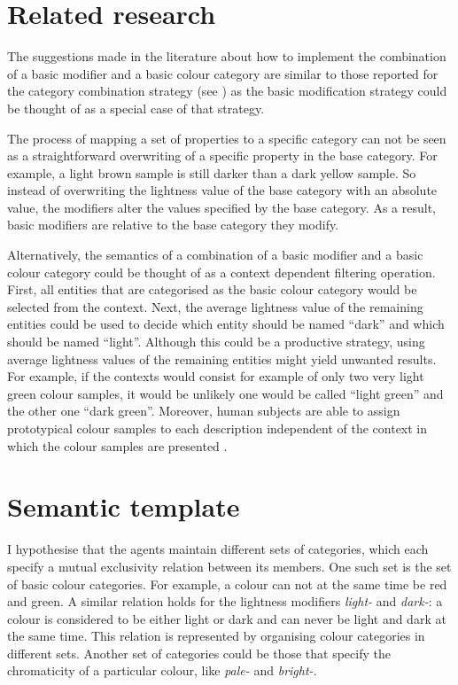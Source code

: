 \section{Related research}

The suggestions made in the literature about how to implement the
combination of a basic modifier and a basic colour category are
similar to those reported for the category combination strategy
(see ) as the basic
  modification strategy could be thought of as a special case of that
strategy.

The process of mapping a set of properties to a specific category can
not be seen as a straightforward overwriting of a specific property
in the base category. For example, a light brown sample is still
darker than a dark yellow sample. So instead of overwriting the
lightness value of the base category with an absolute value, the
modifiers alter the values specified by the base category. As a
result, basic modifiers are relative to the base category they
modify.

Alternatively, the semantics of a combination of a basic
modifier and a basic colour category could be thought of as a context
dependent filtering operation. First, all entities that are categorised
as the basic colour category would be selected from the context. Next,
the average lightness value of the remaining entities could be used to
decide which entity should be named ``dark'' and which should be named
``light''. Although this could be a productive strategy, using  average lightness
values of the remaining entities might yield unwanted results. For example, 
if the contexts would consist for example of
only two very light green colour samples, it would be unlikely one would
be called ``light green'' and the other one ``dark green''. Moreover,
human subjects are able to assign prototypical colour samples to each
description independent of the context in which the colour samples are
presented \citep{safuanova07russian}.

\section{Semantic template}

I hypothesise that the agents maintain different sets of categories,
which each specify a mutual exclusivity relation between its
members. One such set is the set of basic colour categories. For
example, a colour can not at the same time be red and green. A similar
relation holds for the lightness modifiers \textit{light-} and \textit{dark-}:
a colour is considered to be either light or dark and can never be
light and dark at the same time. This relation is represented by
organising colour categories in different sets. Another set of
categories could be those that specify the chromaticity of a
particular colour, like \textit{pale-} and \textit{bright-}.

